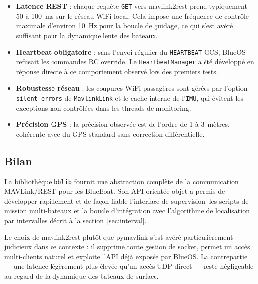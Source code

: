 \begin{itemize}
  \item \textbf{Latence REST} : chaque requête \texttt{GET} vers mavlink2rest prend typiquement 50 à 100~ms sur le réseau WiFi local. Cela impose une fréquence de contrôle maximale d'environ 10~Hz pour la boucle de guidage, ce qui s'est avéré suffisant pour la dynamique lente des bateaux.
  \item \textbf{Heartbeat obligatoire} : sans l'envoi régulier du \texttt{HEARTBEAT} GCS, BlueOS refusait les commandes RC override. Le \texttt{HeartbeatManager} a été développé en réponse directe à ce comportement observé lors des premiers tests.
  \item \textbf{Robustesse réseau} : les coupures WiFi passagères sont gérées par l'option \texttt{silent\_errors} de \texttt{MavlinkLink} et le cache interne de l'\texttt{IMU}, qui évitent les exceptions non contrôlées dans les threads de monitoring.
  \item \textbf{Précision GPS} : la précision observée est de l'ordre de 1 à 3~mètres, cohérente avec du GPS standard sans correction différentielle.
\end{itemize}

\subsection{Bilan}
\label{sec:bblib:bilan}

La bibliothèque \texttt{bblib} fournit une abstraction complète de la communication MAVLink/REST pour les BlueBoat. Son API orientée objet a permis de développer rapidement et de façon fiable l'interface de supervision, les scripts de mission multi-bateaux et la boucle d'intégration avec l'algorithme de localisation par intervalles décrit à la section~\ref{sec:interval}.

Le choix de mavlink2rest plutôt que pymavlink s'est avéré particulièrement judicieux dans ce contexte : il supprime toute gestion de socket, permet un accès multi-clients naturel et exploite l'API déjà exposée par BlueOS. La contrepartie — une latence légèrement plus élevée qu'un accès UDP direct — reste négligeable au regard de la dynamique des bateaux de surface.
